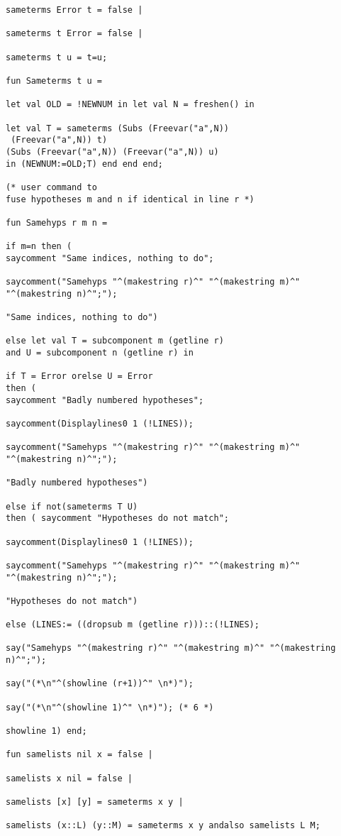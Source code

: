 \documentclass{article}
\begin{document}
{{\begin{verbatim}
sameterms Error t = false |

sameterms t Error = false |

sameterms t u = t=u;

fun Sameterms t u =

let val OLD = !NEWNUM in let val N = freshen() in

let val T = sameterms (Subs (Freevar("a",N))
 (Freevar("a",N)) t) 
(Subs (Freevar("a",N)) (Freevar("a",N)) u)   
in (NEWNUM:=OLD;T) end end end;

(* user command to
fuse hypotheses m and n if identical in line r *)

fun Samehyps r m n =

if m=n then (
saycomment "Same indices, nothing to do";

saycomment("Samehyps "^(makestring r)^" "^(makestring m)^" "^(makestring n)^";");

"Same indices, nothing to do")

else let val T = subcomponent m (getline r) 
and U = subcomponent n (getline r) in

if T = Error orelse U = Error 
then (
saycomment "Badly numbered hypotheses";

saycomment(Displaylines0 1 (!LINES));

saycomment("Samehyps "^(makestring r)^" "^(makestring m)^" "^(makestring n)^";");

"Badly numbered hypotheses")

else if not(sameterms T U) 
then ( saycomment "Hypotheses do not match";

saycomment(Displaylines0 1 (!LINES));

saycomment("Samehyps "^(makestring r)^" "^(makestring m)^" "^(makestring n)^";");

"Hypotheses do not match")

else (LINES:= ((dropsub m (getline r)))::(!LINES);

say("Samehyps "^(makestring r)^" "^(makestring m)^" "^(makestring n)^";");

say("(*\n"^(showline (r+1))^" \n*)"); 

say("(*\n"^(showline 1)^" \n*)"); (* 6 *)

showline 1) end;

fun samelists nil x = false |

samelists x nil = false |

samelists [x] [y] = sameterms x y |

samelists (x::L) (y::M) = sameterms x y andalso samelists L M;


\end{verbatim}}}
\end{document}
